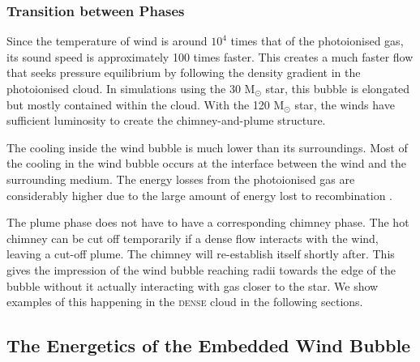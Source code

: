 \documentclass[a4paper,fleqn,usenatbib]{mnras}
\newcommand{\Msolar}{M$_{\odot}$\xspace}
\begin{document}
\subsubsection{Transition between Phases}
\label{results:evolutionwindbubble:phases}

Since the temperature of wind is around $10^4$ times that of the photoionised gas, its sound speed is approximately 100 times faster. This creates a much faster flow that seeks pressure equilibrium by following the density gradient in the photoionised cloud. In simulations using the 30 \Msolar star, this bubble is elongated but mostly contained within the cloud. With the 120 \Msolar star, the winds have sufficient luminosity to create the chimney-and-plume structure.

The cooling inside the wind bubble is much lower than its surroundings. Most of the cooling in the wind bubble occurs at the interface between the wind and the surrounding medium. The energy losses from the photoionised gas are considerably higher due to the large amount of energy lost to recombination \citep[see the analysis by][]{Walch2012}. 

The plume phase does not have to have a corresponding chimney phase. The hot chimney can be cut off temporarily if a dense flow interacts with the wind, leaving a cut-off plume. The chimney will re-establish itself shortly after. This gives the impression of the wind bubble reaching radii towards the edge of the bubble without it actually interacting with gas closer to the star. We show examples of this happening in the \textsc{dense} cloud in the following sections.

\subsection{The Energetics of the Embedded Wind Bubble}
\label{results:energeticswindbubble}
\end{document}
